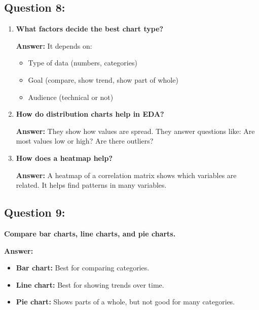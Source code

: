 \documentclass{article}
\begin{document}
\subsection*{Question 8:}
\begin{enumerate}[label=(\alph*)]
    \item \textbf{What factors decide the best chart type?}

    \textbf{Answer:} It depends on:
    \begin{itemize}
        \item Type of data (numbers, categories)
        \item Goal (compare, show trend, show part of whole)
        \item Audience (technical or not)
    \end{itemize}

    \item \textbf{How do distribution charts help in EDA?}

    \textbf{Answer:} They show how values are spread. They answer questions like: Are most values low or high? Are there outliers?

    \item \textbf{How does a heatmap help?}

    \textbf{Answer:} A heatmap of a correlation matrix shows which variables are related. It helps find patterns in many variables.
\end{enumerate}

\subsection*{Question 9:}
\textbf{Compare bar charts, line charts, and pie charts.}

\textbf{Answer:}
\begin{itemize}
    \item \textbf{Bar chart:} Best for comparing categories.
    \item \textbf{Line chart:} Best for showing trends over time.
    \item \textbf{Pie chart:} Shows parts of a whole, but not good for many categories.
\end{itemize}
\end{document}
